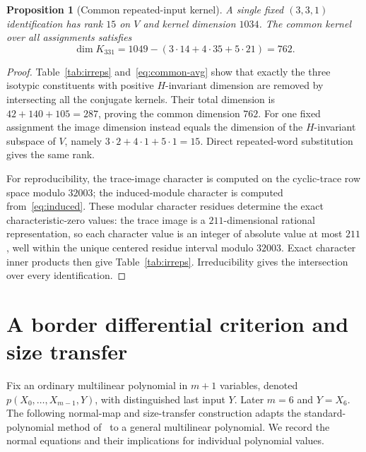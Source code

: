 \documentclass[11pt,reqno]{amsart}
\newtheorem{proposition}[theorem]{Proposition}
\theoremstyle{definition}
\begin{document}
\begin{proposition}[Common repeated-input kernel]\label{prop:common}
A single fixed $(3,3,1)$ identification has rank $15$ on $V$ and kernel dimension $1034$.  The common kernel over \emph{all} assignments satisfies
\[
 \dim K_{331}=1049-(3\cdot14+4\cdot35+5\cdot21)=762.
\]
\end{proposition}
\begin{proof}
Table~\ref{tab:irreps} and~\eqref{eq:common-avg} show that exactly the three isotypic constituents with positive $H$-invariant dimension are removed by intersecting all the conjugate kernels.  Their total dimension is $42+140+105=287$, proving the common dimension $762$.  For one fixed assignment the image dimension instead equals the dimension of the $H$-invariant subspace of $V$, namely $3\cdot2+4\cdot1+5\cdot1=15$.  Direct repeated-word substitution gives the same rank.

For reproducibility, the trace-image character is computed on the cyclic-trace row space modulo $32003$; the induced-module character is computed from~\eqref{eq:induced}.  These modular character residues determine the exact characteristic-zero values: the trace image is a $211$-dimensional rational representation, so each character value is an integer of absolute value at most $211$, well within the unique centered residue interval modulo $32003$.  Exact character inner products then give Table~\ref{tab:irreps}.  Irreducibility gives the intersection over every identification.
\end{proof}

\section{A border differential criterion and size transfer}\label{sec:border}
Fix an ordinary multilinear polynomial in $m+1$ variables, denoted $p(X_0,\ldots,X_{m-1},Y)$, with distinguished last input $Y$.  Later $m=6$ and $Y=X_6$.  The following normal-map and size-transfer construction adapts the standard-polynomial method of~\cite[Lemma~11.1 and Theorem~11.3]{Miah2026} to a general multilinear polynomial.  We record the normal equations and their implications for individual polynomial values.
\end{document}

